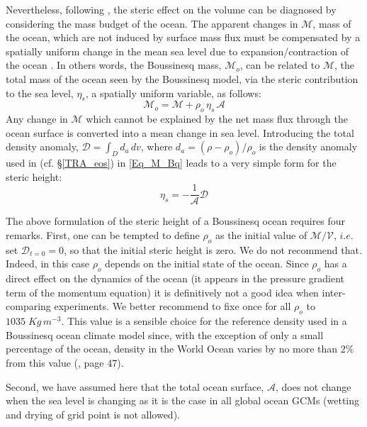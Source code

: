 Nevertheless, following \citep{Greatbatch_JGR94}, the steric effect on the volume can be 
diagnosed by considering the mass budget of the ocean. 
The apparent changes in $\mathcal{M}$, mass of the ocean, which are not induced by surface 
mass flux must be compensated by a spatially uniform change in the mean sea level due to 
expansion/contraction of the ocean \citep{Greatbatch_JGR94}. In others words, the Boussinesq 
mass, $\mathcal{M}_o$, can be related to $\mathcal{M}$, the  total mass of the ocean seen 
by the Boussinesq model, via the steric contribution to the sea level, $\eta_s$, a spatially 
uniform variable, as follows:
\begin{equation}  \label{Eq_M_Bq}
   \mathcal{M}_o  =  \mathcal{M} + \rho_o \,\eta_s \,\mathcal{A} 
\end{equation}
Any change in $\mathcal{M}$ which cannot be explained by the net mass flux through 
the ocean surface is converted into a mean change in sea level. Introducing the total density 
anomaly, $\mathcal{D}= \int_D d_a \,dv$, where $d_a= (\rho -\rho_o ) / \rho_o$  
is the density anomaly used in \NEMO (cf. \S\ref{TRA_eos}) in \eqref{Eq_M_Bq}
leads to a very simple form for the steric height:
\begin{equation}  \label{Eq_steric_Bq}
   \eta_s = - \frac{1}{\mathcal{A}} \mathcal{D} 
\end{equation}

The above formulation of the steric height of a Boussinesq ocean requires four remarks.
First, one can be tempted to define $\rho_o$ as the initial value of $\mathcal{M}/\mathcal{V}$,
$i.e.$ set $\mathcal{D}_{t=0}=0$, so that the initial steric height is zero. We do not
recommend that. Indeed, in this case $\rho_o$ depends on the initial state of the ocean. 
Since $\rho_o$ has a direct effect on the dynamics of the ocean (it appears in the pressure 
gradient term of the momentum equation) it is definitively not a good idea when 
inter-comparing experiments. 
We better recommend to fixe once for all $\rho_o$ to $1035\;Kg\,m^{-3}$. This value is a 
sensible choice for the reference density used in a Boussinesq ocean climate model since, 
with the exception of only a small percentage of the ocean, density in the World Ocean 
varies by no more than 2$\%$ from this value (\cite{Gill1982}, page 47).

Second, we have assumed here that the total ocean surface, $\mathcal{A}$, does not
change when the sea level is changing as it is the case in all global ocean GCMs 
(wetting and drying of grid point is not allowed). 
  
